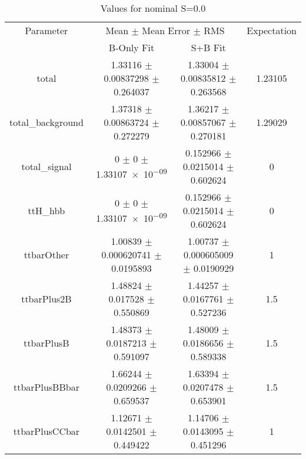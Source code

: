 \begin{table}
\centering
\caption{Values for nominal S=0.0}
\begin{tabular}{cccc}
\toprule
Parameter & \multicolumn{2}{c}{Mean $\pm$ Mean Error $\pm$ RMS} & Expectation\\
 & B-Only Fit & S+B Fit & \\
\midrule
total & \num{1.33116} $\pm$ \num{0.00837298} $\pm$ \num{0.264037} & \num{1.33004} $\pm$ \num{0.00835812} $\pm$ \num{0.263568} & \num{1.23105}\\
total\_background & \num{1.37318} $\pm$ \num{0.00863724} $\pm$ \num{0.272279} & \num{1.36217} $\pm$ \num{0.00857067} $\pm$ \num{0.270181} & \num{1.29029}\\
total\_signal & \num{0} $\pm$ \num{0} $\pm$ \num{1.33107e-09} & \num{0.152966} $\pm$ \num{0.0215014} $\pm$ \num{0.602624} & \num{0}\\
ttH\_hbb & \num{0} $\pm$ \num{0} $\pm$ \num{1.33107e-09} & \num{0.152966} $\pm$ \num{0.0215014} $\pm$ \num{0.602624} & \num{0}\\
ttbarOther & \num{1.00839} $\pm$ \num{0.000620741} $\pm$ \num{0.0195893} & \num{1.00737} $\pm$ \num{0.000605009} $\pm$ \num{0.0190929} & \num{1}\\
ttbarPlus2B & \num{1.48824} $\pm$ \num{0.017528} $\pm$ \num{0.550869} & \num{1.44257} $\pm$ \num{0.0167761} $\pm$ \num{0.527236} & \num{1.5}\\
ttbarPlusB & \num{1.48373} $\pm$ \num{0.0187213} $\pm$ \num{0.591097} & \num{1.48009} $\pm$ \num{0.0186656} $\pm$ \num{0.589338} & \num{1.5}\\
ttbarPlusBBbar & \num{1.66244} $\pm$ \num{0.0209266} $\pm$ \num{0.659537} & \num{1.63394} $\pm$ \num{0.0207478} $\pm$ \num{0.653901} & \num{1.5}\\
ttbarPlusCCbar & \num{1.12671} $\pm$ \num{0.0142501} $\pm$ \num{0.449422} & \num{1.14706} $\pm$ \num{0.0143095} $\pm$ \num{0.451296} & \num{1}\\
\bottomrule
\end{tabular}
\end{table}